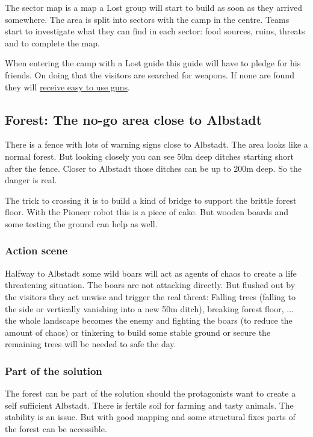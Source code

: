 The sector map is a map a Lost group will start to build as soon as they arrived somewhere. The area is split into sectors with the camp in the centre. Teams start to investigate what they can find in each sector: food sources, ruins, threats and to complete the map.

When entering the camp with a Lost guide this guide will have to pledge for his friends. On doing that the visitors are searched for weapons. If none are found they will \hyperref[sec:Lost guests and weapons]{receive easy to use guns}.

\subsection{Forest: The no-go area close to Albstadt}

There is a fence with lots of warning signs close to Albstadt. The area looks like a normal forest. But looking closely you can see 50m deep ditches starting short after the fence. Closer to Albstadt those ditches can be up to 200m deep. So the danger is real.

The trick to crossing it is to build a kind of bridge to support the brittle forest floor. With the Pioneer robot this is a piece of cake. But wooden boards and some testing the ground can help as well.


\subsubsection{Action scene}

Halfway to Albstadt some wild boars will act as agents of chaos to create a life threatening situation. The boars are not attacking directly. But flushed out by the visitors they act unwise and trigger the real threat: Falling trees (falling to the side or vertically vanishing into a new 50m ditch), breaking forest floor, ...
the whole landscape becomes the enemy and fighting the boars (to reduce the amount of chaos) or tinkering to build some stable ground or secure the remaining trees will be needed to safe the day.

\subsubsection{Part of the solution}

The forest can be part of the solution should the protagonists want to create a self sufficient Albstadt. There is fertile soil for farming and tasty animals. The stability is an issue. But with good mapping and some structural fixes parts of the forest can be accessible.

